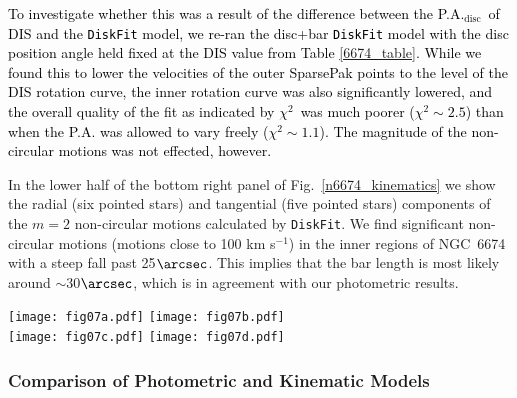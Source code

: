 \documentclass[a4paper,fleqn,usenatbib]{mnras}
\newcommand{\authorfix}{\textcolor{black}}
\begin{document}
\authorfix{To investigate whether this was a result of the difference between the P.A.$_{\mathrm{disc}}$\ of DIS and the \texttt{DiskFit} model, we re-ran the disc+bar \texttt{DiskFit} model with the disc position angle held fixed at the DIS value from Table \ref{6674_table}. While we found this to lower the velocities of the outer SparsePak points to the level of the DIS rotation curve, the inner rotation curve was also significantly lowered, and the overall quality of the fit as indicated by $\chi^{2}$\ was much poorer ($\chi^{2} \sim 2.5$) than when the P.A. was allowed to vary freely ($\chi^{2} \sim 1.1$). The magnitude of the non-circular motions was not effected, however.}

In the lower half of the bottom right panel of Fig.~\ref{n6674_kinematics} we show the radial (six pointed stars) and tangential (five pointed stars) components of the $m=2$ non-circular motions calculated by \texttt{DiskFit}. We find significant non-circular motions (motions close to 100 km s$^{-1}$) in the inner regions of NGC~6674 with a steep fall past 25$\arcsec$. This implies that the bar length is most likely around $\sim$30$\arcsec$, which is in agreement with our photometric results.

\begin{figure*}
	\center
    	\hskip 10mm \texttt{[image: fig07a.pdf]} \hskip 2mm \texttt{[image: fig07b.pdf]}\\
	\hskip 2mm
    	\texttt{[image: fig07c.pdf]} \hskip 2mm \texttt{[image: fig07d.pdf]}
  	\caption{Kinematic model and rotation curves for NGC~6674. \textit{Top Left}: Disc+Bar model velocities from \texttt{DiskFit}. Empty fibres in velocity field indicate no observed emission; \textit{Top Right}: Residual velocity field showing the difference between observed SparsePak velocity field and the \texttt{DiskFit} model; \textit{Bottom Left}: Derived SparsePak rotation curve without a bar (dark green circles) and observed DIS rotation curve (red and blue triangles); \textit{Bottom Right}: Derived SparsePak rotation curve including a bar and observed DIS rotation curve, the vertical line indicates the radius of the bar. The bottom portions of the bottom panels show the amplitudes of the tangential (turquoise five pointed stars) and radial (orange 6 pointed stars) components of the non-circular motions.}
  	\label{n6674_kinematics}
\end{figure*}

\subsubsection{Comparison of Photometric and Kinematic Models}
\label{sec:n6674compare}
\end{document}
